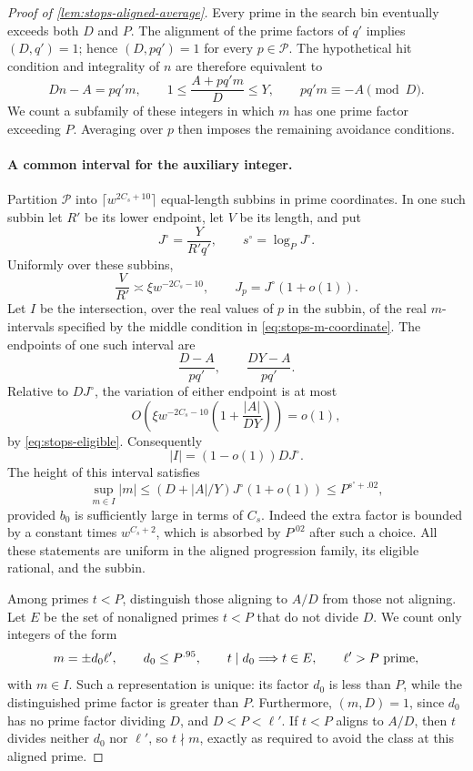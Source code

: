\begin{proof}[Proof of \cref{lem:stops-aligned-average}]
Every prime in the search bin eventually exceeds both $D$ and $P$.
The alignment of the prime factors of $q'$ implies $(D,q')=1$;
hence $(D,pq')=1$ for every $p\in\mathcal P$.  The hypothetical hit
condition and integrality of $n$ are therefore equivalent to
\begin{equation}\label{eq:stops-m-coordinate}
 Dn-A=pq'm,
 \qquad
 1\le\frac{A+pq'm}{D}\le Y,
 \qquad pq'm\equiv-A\pmod D.
\end{equation}
We count a subfamily of these integers in which $m$ has one prime
factor exceeding $P$.  Averaging over $p$ then imposes the remaining
avoidance conditions.

\paragraph{A common interval for the auxiliary integer.}
Partition $\mathcal P$ into
$\lceil w^{2C_s+10}\rceil$ equal-length subbins in prime coordinates.
In one such subbin let $R'$ be its lower endpoint, let $V$ be its
length, and put
\[
 J^\circ=\frac{Y}{R'q'},\qquad s^\circ=\log_P J^\circ.
\]
Uniformly over these subbins,
\begin{equation}\label{eq:stops-subbin-size}
 \frac{V}{R'}\asymp\xi w^{-2C_s-10},
 \qquad J_p=J^\circ(1+o(1)).
\end{equation}
Let $I$ be the intersection, over the real values of $p$ in the
subbin, of the real $m$-intervals specified by the middle condition
in \eqref{eq:stops-m-coordinate}.  The endpoints of one such interval
are
\[
 \frac{D-A}{pq'},\qquad \frac{DY-A}{pq'}.
\]
Relative to $DJ^\circ$, the variation of either endpoint is at most
\[
 O\left(\xi w^{-2C_s-10}
       \left(1+\frac{|A|}{DY}\right)\right)=o(1),
\]
by \eqref{eq:stops-eligible}.  Consequently
\begin{equation}\label{eq:stops-common-interval}
 |I|=(1-o(1))DJ^\circ.
\end{equation}
The height of this interval satisfies
\[
 \sup_{m\in I}|m|
 \le (D+|A|/Y)J^\circ(1+o(1))
 \le P^{s^\circ+.02},
\]
provided $b_0$ is sufficiently large in terms of $C_s$.  Indeed the
extra factor is bounded by a constant times $w^{C_s+2}$, which is
absorbed by $P^{.02}$ after such a choice.  All these statements are
uniform in the aligned progression family, its eligible rational,
and the subbin.

Among primes $t<P$, distinguish those aligning to $A/D$ from those
not aligning.  Let $E$ be the set of nonaligned primes $t<P$ that do
not divide $D$.  We count only integers of the form
\begin{equation}\label{eq:stops-factorization}
 m=\pm d_0\ell',\qquad
 d_0\le P^{.95},\qquad
 t\mid d_0\Longrightarrow t\in E,\qquad
 \ell'>P\ \hbox{prime},
\end{equation}
with $m\in I$.  Such a representation is unique: its factor $d_0$
is less than $P$, while the distinguished prime factor is greater than
$P$.  Furthermore, $(m,D)=1$, since $d_0$ has no prime factor dividing
$D$, and $D<P<\ell'$.  If $t<P$ aligns to $A/D$, then $t$ divides
neither $d_0$ nor $\ell'$, so $t\nmid m$, exactly as required to
avoid the class at this aligned prime.


\end{proof}
